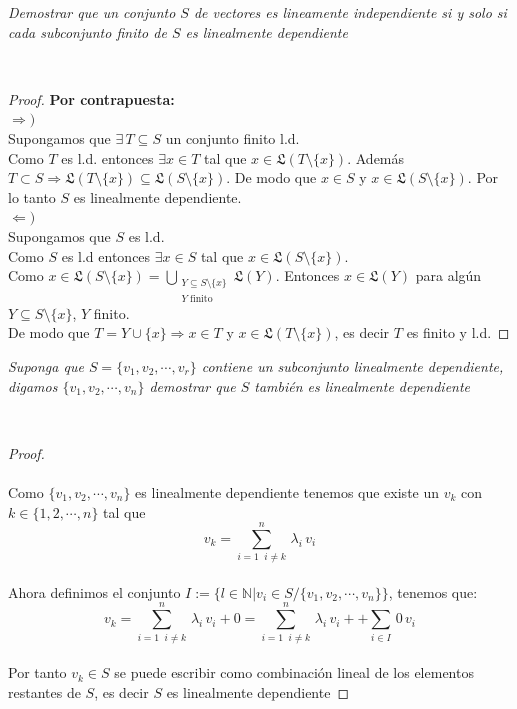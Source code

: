 \documentclass[11pt,letterpaper]{article}
\newcommand{\N}{\mathbb{N}}
\newcommand{\Li}{\mathfrak{L}}
\begin{document}
\begin{tcolorbox}[
	title = \textcolor{black}{\textcolor{white}{Problema 10}},]
\textit{Demostrar que un conjunto $S$ de vectores es lineamente independiente si y solo si cada subconjunto finito de $S$ es linealmente dependiente 
}
\end{tcolorbox}\,\\
\begin{proof}
    \textbf{Por contrapuesta:}\\[10pt]
        $\Rightarrow )$\\[10pt]
        Supongamos que $\exists\, T\subseteq S$ un conjunto finito l.d.\\ Como $T$ es l.d. entonces $\exists x\in T$ tal que $x\in\Li(T\setminus\{x\})$.
        Además $T\subset S \Rightarrow \Li(T\setminus\{x\})\subseteq\Li(S\setminus\{x\})$. De modo que $x\in S$ y $x\in\Li(S\setminus\{x\})$. Por lo tanto $S$ es linealmente dependiente.\\[10pt]
        $\Leftarrow )$\\[10pt]
        Supongamos que $S$ es l.d.\\
        Como $S$ es l.d entonces $\exists x\in S$ tal que $x\in\Li(S\setminus\{x\})$. \\
        Como $x\in\Li(S\setminus\{x\})=\bigcup_{\substack{Y\subseteq S\setminus\{x\} \\ Y\;\text{finito}}}\Li(Y)$. 
        Entonces $x\in \Li(Y)$ para algún $Y\subseteq S\setminus\{x\}$, $Y$ finito.\\[10pt]
        De modo que $T=Y\cup\{x\} \Rightarrow x\in T$ y $x\in\Li(T\setminus\{x\})$, es decir $T$ es finito y l.d.
\end{proof}
\begin{tcolorbox}[
	title = \textcolor{black}{\textcolor{white}{Problema 11}},]
\textit{Suponga que $S=\{v_1,v_2,\cdots,v_r\}$ contiene un subconjunto linealmente dependiente, digamos $\{v_1,v_2,\cdots,v_n\}$
demostrar que $S$ tambi\'en es linealmente dependiente
}
\end{tcolorbox}\,\\
\begin{proof}\,\\
    \,\\
    Como $\{v_1,v_2,\cdots,v_n\}$ es linealmente dependiente tenemos que existe un $v_k$ con $k\in \{1,2,\cdots,n\}$ tal que\,\\
    \begin{equation*}
        v_k=\sum_{i=1\,\,\:
        i\neq k}^{n}\,\lambda_i\,v_i
    \end{equation*}\,\\
    Ahora definimos el conjunto $I:=\{l\in \N|v_i\in S/\{v_1,v_2,\cdots,v_n\}\}$, tenemos que:\,\\
    \begin{equation*}
        v_k=\sum_{i=1\,\,\:
        i\neq k}^{n}\,\lambda_i\,v_i+0=\sum_{i=1\,\,\:
        i\neq k}^{n}\,\lambda_i\,v_i++\sum_{i\in I}\,0\,v_i
    \end{equation*}\,\\
Por tanto $v_k\in S$ se puede escribir como combinaci\'on lineal de los elementos restantes de $S$, es decir $S$ es linealmente dependiente
\end{proof}\,\\
\end{document}
